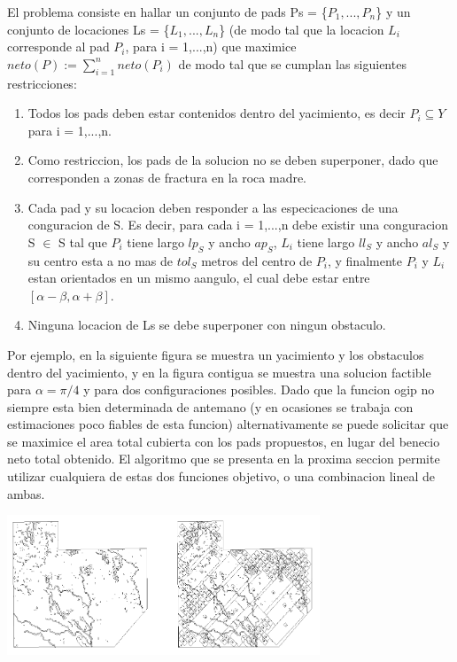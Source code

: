 El problema consiste en hallar un conjunto de pads Ps = \{$P_1, ... ,P_n$\} y un conjunto de locaciones Ls = \{$L_1, ..., L_n$\} (de modo tal que la locacion $L_i$ corresponde al pad $P_i$, para i = 1,...,n) que maximice $neto(P) :=  \sum_{i=1}^{n} neto(P_i) $ de modo tal que se cumplan las siguientes restricciones:

\begin{enumerate}
\item Todos los pads deben estar contenidos dentro del yacimiento, es decir $P_i \subseteq Y$ para i = 1,...,n.
\item Como restriccion, los pads de la solucion no se deben superponer, dado que corresponden a zonas de fractura en la roca madre.
\item Cada pad y su locacion deben responder a las especicaciones de una conguracion de S. Es decir, para cada i = 1,...,n debe existir una conguracion S $\in$ S tal que $P_i$ tiene largo $lp_S$ y ancho $ap_S$, $L_i$ tiene largo $ll_S$ y ancho $al_S$ y su centro esta a no mas de $tol_S$ metros del centro de $P_i$, y finalmente $P_i$ y $L_i$ estan orientados en un mismo aangulo, el cual debe estar entre $[\alpha - \beta, \alpha + \beta]$.
\item Ninguna locacion de Ls se debe superponer con ningun obstaculo.
\end{enumerate}


Por ejemplo, en la siguiente figura se muestra un yacimiento y los obstaculos dentro del yacimiento, y en la figura contigua se muestra una solucion factible para $\alpha = \pi / 4$ y para dos configuraciones posibles. Dado que la funcion ogip no siempre esta bien determinada de antemano (y en ocasiones se trabaja con estimaciones poco fiables de esta funcion) alternativamente se puede solicitar que se maximice el area total cubierta con los pads propuestos, en lugar del benecio neto total obtenido. El algoritmo que se presenta en la proxima seccion permite utilizar cualquiera de estas dos funciones objetivo, o una combinacion lineal de ambas.



\begin{center}
\includegraphics[width=0.7\textwidth]{imagenes/figura7}
\end{center}

